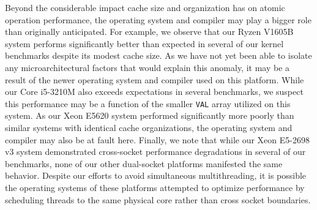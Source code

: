 Beyond the considerable impact cache size and organization has on atomic operation performance, the operating system and compiler may play a bigger role than originally anticipated.
For example, we observe that our Ryzen V1605B system performs significantly better than expected in several of our kernel benchmarks despite its modest cache size.
As we have not yet been able to isolate any microarchitectural factors that would explain this anomaly, it may be a result of the newer operating system and compiler used on this platform.
While our Core i5-3210M also exceeds expectations in several benchmarks, we suspect this performance may be a function of the smaller \texttt{VAL} array utilized on this system.
As our Xeon E5620 system performed significantly more poorly than similar systems with identical cache organizations, the operating system and compiler may also be at fault here.
Finally, we note that while our Xeon E5-2698 v3 system demonstrated cross-socket performance degradations in several of our benchmarks, none of our other dual-socket platforms manifested the same behavior.
Despite our efforts to avoid simultaneous multithreading, it is possible the operating systems of these platforms attempted to optimize performance by scheduling threads to the same physical core rather than cross socket boundaries.